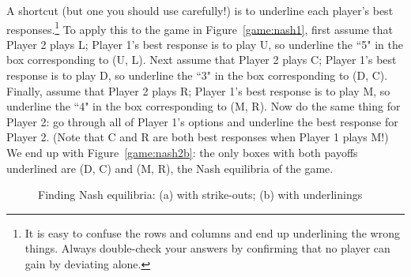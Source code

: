 A shortcut (but one you should use carefully!) is to underline each player's best responses.\footnote{It is easy to confuse the rows and columns and end up underlining the wrong things. Always double-check your answers by confirming that no player can gain by deviating alone.} To apply this to the game in Figure~\ref{game:nash1}, first assume that Player 2 plays L; Player 1's best response is to play U, so underline the ``5" in the box corresponding to (U, L). Next assume that Player 2 plays C; Player 1's best response is to play D, so underline the ``3" in the box corresponding to (D, C). Finally, assume that Player 2 plays R; Player 1's best response is to play M, so underline the ``4" in the box corresponding to (M, R). Now do the same thing for Player 2: go through all of Player 1's options and underline the best response for Player 2. (Note that C and R are both best responses when Player 1 plays M!) We end up with Figure~\ref{game:nash2b}: the only boxes with both payoffs underlined are (D, C) and (M, R), the Nash equilibria of the game. \enlargethispage{\baselineskip}

\begin{figure}[h]
\centering
\hspace{.5cm}
%
\hspace{1cm}
%
\caption{Finding Nash equilibria: (a) with strike-outs; (b) with underlinings}
\label{game:nash2} %
\end{figure}


